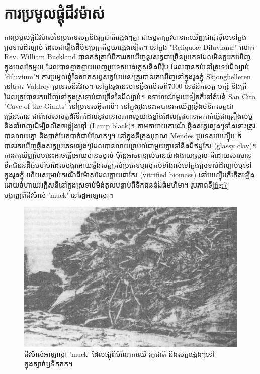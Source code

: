 \documentclass[10pt,twocolumn,letterpaper]{article}
\begin{document}
\section{ការប្រមូលផ្ដុំជីវម៉ាស់}

ការប្រមូលផ្តុំជីវម៉ាស់នៃប្រភេទសត្វនិងរុក្ខជាតិផ្សេងៗគ្នា ជាធម្មតាត្រូវបានរកឃើញជាផូសុីលនៅក្នុងស្រទាប់ដីល្បាប់ ដែលជារឿងដ៏មិនប្រក្រតីមួយផ្សេងទៀត។ នៅក្នុង "Reliquoæ Diluvianæ" លោក Rev. William Buckland បានកត់ត្រាអំពីការរកឃើញនូវសត្វជាច្រើនប្រភេទដែលមិនគួររកឃើញក្នុងពេលតែមួយ ដែលបានខ្ចាតខ្ចាយពេញប្រទេសអង់គ្លេសនិងអឺរ៉ុប ដែលបានកប់នៅស្រទប់ដីល្បាប់ 'diluvium'\cite{58}។ ការប្រមូលផ្តុំនៃសាកសព្វសត្វបែបនេះត្រូវបានរកឃើញនៅក្នុងរូងភ្នុំ Skjonghelleren នៅកោះ Valdroy ប្រទេសន័រវែស។ នៅក្នុងរូងនេះមានឆ្អឹងលើសពី7000 នៃថនិកសត្វ បក្សុី និងត្រី ដែលត្រូវបានរកឃើញនៅក្នុងស្រទាប់ជាច្រើននៃដីល្បាប់\cite{59}។ ឧទាហរណ៍មួយទៀតគឺនៅតំបន់ San Ciro "Cave of the Giants" នៅប្រទេសអុីតាលី។ នៅក្នុងរូងនេះគេបានរកឃើញឆ្អឹងថនិកសត្វជាច្រើនតោន ជាពិសេសសត្វដំរីទឹកដែលនូវមានសភាពល្អយ៉ាងខ្លាំងដែលត្រូវបានគេកាត់ធ្វើជាគ្រឿងលម្អ និងនាំចេញដើម្បីផលិតចង្កៀងខ្មៅ (Lamp black)។ តាមការរាយការណ៍ ឆ្អឹងសត្វផ្សេងៗទាំងនោះត្រូវបានលាយគ្នា និងបាក់បែកបាក់ជាបំណែកៗ\cite{60,61}។ នៅក្នុងទីក្រុងបុរាណ Mendes ប្រទេសអេហ្ស៊ីប ក៏បានរកឃើញឆ្អឹងសត្វប្រភេទផ្សេងៗដែលបានលាយច្របល់ជាមួយគ្នាទៅនឹងដីឥដ្ឋកែវ (glassy clay)\cite{57}។ ការរកឃើញបែបនេះអាចធ្វើអោយមានចម្ងល់ ប៉ុន្តែអាចពន្យល់បានយ៉ាងងាយស្រួល គឺដោយសារមានទឹកជំនន់ដ៏ធំមហិមាដែលបង្ករអោយឆ្នឹងសត្វគ្រប់ប្រភេទហូរឬកប់ទាំងរស់ទៅក្នុងស្រទាប់ដីល្បាប់ឬនៅក្នុងរូងភ្នុំ ហើយសម្រាប់ករណីជីវម៉ាស់ដែលក្លាយជាកែវ (vitrified biomass) នៅអេហ្ស៊ីបគឺកើតឡើងដោយចំហាយអគ្គិសនីនៅក្នុងស្រទាប់ម៉ង់តូលបន្ទាប់ពីទឹកជំនន់ដ៏ធំមហិមា។ រូបភាពទី\ref{fig:7} បង្ហាញពីជីវម៉ាស់ 'muck' នៅរដ្ឋអាឡាស្កា\cite{56}។

\begin{figure}[t]
\begin{center}
   \includegraphics[width=1\linewidth]{muck-crop.jpeg}
\end{center}
   \caption{ជីវម៉ាស់អាឡាស្កា 'muck' ដែលផ្សុំពីបំណែកឈើ រុក្ខជាតិ និងសត្វផ្សេងៗនៅក្នុងក្សាច់ឬទឹកកក\cite{146}។}
\label{fig:7}
\label{fig:onecol}
\end{figure}
\end{document}
